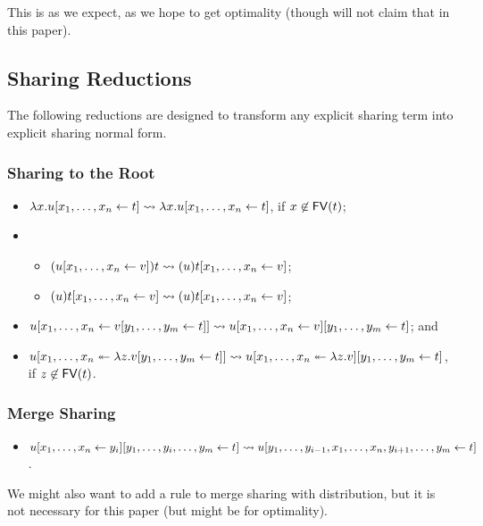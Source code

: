 \documentclass[11pt,a4paper]{article}
\theoremstyle{definition}
\theoremstyle{plain}
\theoremstyle{remark}
\begin{document}
This is as we expect, as we hope to get optimality (though will not claim that in this paper).

\subsection{Sharing Reductions}

The following reductions are designed to transform any explicit sharing term into explicit sharing normal form.

\subsubsection{Sharing to the Root}

\begin{itemize}
 \item $\lambda x.{{{u}[{{x_1},\dots,{x_n}}\leftarrow{t}]}}\rightsquigarrow{{{\lambda x.u}[{{x_1},\dots,{x_n}}\leftarrow{t}]}}$, if $x\not\in{\mathop{\mathsf{FV}}}(t)$;
 \item \begin{itemize}
        \item $({{{u}[{{x_1},\dots,{x_n}}\leftarrow{v}]}})t\rightsquigarrow{{{(u)t}[{{x_1},\dots,{x_n}}\leftarrow{v}]}}$;
        \item $(u){{{t}[{{x_1},\dots,{x_n}}\leftarrow{v}]}}\rightsquigarrow{{{(u)t}[{{x_1},\dots,{x_n}}\leftarrow{v}]}}$;
       \end{itemize}
 \item ${{{u}[{{x_1},\dots,{x_n}}\leftarrow{{{{v}[{{y_1},\dots,{y_m}}\leftarrow{t}]}}}]}}\rightsquigarrow{{{{{{u}[{{x_1},\dots,{x_n}}\leftarrow{v}]}}}[{{y_1},\dots,{y_m}}\leftarrow{t}]}}$; and
 \item ${{u}[{x_1},\dots,{x_n}\twoheadleftarrow{\lambda{z}.{{{{v}[{{y_1},\dots,{y_m}}\leftarrow{t}]}}}}]}\rightsquigarrow{{{{{u}[{x_1},\dots,{x_n}\twoheadleftarrow{\lambda{z}.{v}}]}}[{{y_1},\dots,{y_m}}\leftarrow{t}]}}$, if $z\not\in{\mathop{\mathsf{FV}}}(t)$.
\end{itemize}

\subsubsection{Merge Sharing}

\begin{itemize}
 \item ${{{{{u}[{{x_1},\dots,{x_n}}\leftarrow{y_i}]}}}[{y_1,\dots,y_i,\dots,y_m}\leftarrow{t}]}\rightsquigarrow
	{{u}[{y_1,\dots,y_{i-1},x_1,\dots,x_n,y_{i+1},\dots,y_m}\leftarrow{t}]}$.
\end{itemize}

We might also want to add a rule to merge sharing with distribution, but it is not necessary for this paper (but might be for optimality).
\end{document}
